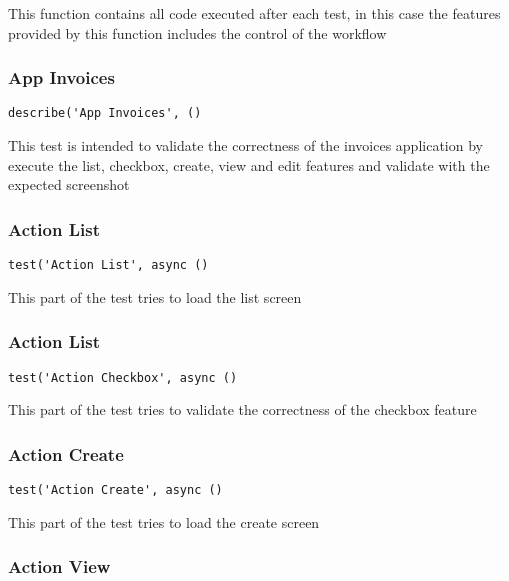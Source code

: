 \documentclass[a4paper]{article}
\begin{document}
This function contains all code executed after each test, in this case the
features provided by this function includes the control of the workflow

\hypertarget{toc229}{}
\subsubsection{App Invoices}

\begin{lstlisting}
describe('App Invoices', ()
\end{lstlisting}

This test is intended to validate the correctness of the invoices application
by execute the list, checkbox, create, view and edit features and validate with
the expected screenshot

\hypertarget{toc230}{}
\subsubsection{Action List}

\begin{lstlisting}
test('Action List', async ()
\end{lstlisting}

This part of the test tries to load the list screen

\hypertarget{toc231}{}
\subsubsection{Action List}

\begin{lstlisting}
test('Action Checkbox', async ()
\end{lstlisting}

This part of the test tries to validate the correctness of the checkbox
feature

\hypertarget{toc232}{}
\subsubsection{Action Create}

\begin{lstlisting}
test('Action Create', async ()
\end{lstlisting}

This part of the test tries to load the create screen

\hypertarget{toc233}{}
\subsubsection{Action View}
\end{document}
